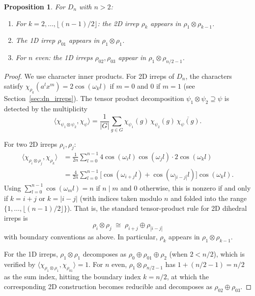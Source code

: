 \documentclass{article}
\newtheorem{proposition}[theorem]{Proposition}
\theoremstyle{definition}
\theoremstyle{remark}
\begin{document}
\begin{proposition}\label{prop:generation}
For $D_n$ with $n > 2$:
\begin{enumerate}
    \item For $k = 2, \ldots, \lfloor(n-1)/2\rfloor$: the 2D irrep $\rho_k$ appears in $\rho_1 \otimes \rho_{k-1}$.
    \item The 1D irrep $\rho_{01}$ appears in $\rho_1 \otimes \rho_1$.
    \item For $n$ even: the 1D irreps $\rho_{02}, \rho_{03}$ appear in $\rho_1 \otimes \rho_{n/2-1}$.
\end{enumerate}
\end{proposition}
\begin{proof}
We use character inner products. For 2D irreps of $D_n$, the characters satisfy $\chi_{\rho_k}(a^l x^m) = 2\cos(\omega_k l)$ if $m = 0$ and $0$ if $m = 1$ (see Section~\ref{sec:dn_irreps}). The tensor product decomposition $\psi_1 \otimes \psi_2 \supseteq \psi$ is detected by the multiplicity
\[
\langle \chi_{\psi_1 \otimes \psi_2}, \chi_\psi \rangle
= \frac{1}{|G|} \sum_{g \in G} \chi_{\psi_1}(g)\, \chi_{\psi_2}(g)\, \overline{\chi_\psi(g)}.
\]

For two 2D irreps $\rho_i, \rho_j$:
\begin{align*}
\langle \chi_{\rho_i \otimes \rho_j}, \chi_{\rho_k} \rangle
&= \frac{1}{2n} \sum_{l=0}^{n-1} 4\cos(\omega_i l)\cos(\omega_j l) \cdot 2\cos(\omega_k l) \\
&= \frac{4}{2n} \sum_{l=0}^{n-1} \bigl[\cos(\omega_{i+j} l) + \cos(\omega_{|i-j|} l)\bigr] \cos(\omega_k l).
\end{align*}
Using $\sum_{l=0}^{n-1} \cos(\omega_m l) = n$ if $n \mid m$ and $0$ otherwise, this is nonzero if and only if $k = i + j$ or $k = |i - j|$ (with indices taken modulo $n$ and folded into the range $\{1, \ldots, \lfloor(n-1)/2\rfloor\}$). That is, the standard tensor-product rule for 2D dihedral irreps is
\[
\rho_i \otimes \rho_j \;\cong\; \rho_{i+j} \oplus \rho_{|i-j|}
\]
with boundary conventions as above. In particular, $\rho_k$ appears in $\rho_1 \otimes \rho_{k-1}$.

For the 1D irreps, $\rho_1 \otimes \rho_1$ decomposes as $\rho_0 \oplus \rho_{01} \oplus \rho_2$ (when $2 < n/2$), which is verified by $\langle \chi_{\rho_1 \otimes \rho_1}, \chi_{\rho_{01}} \rangle = 1$. For $n$ even, $\rho_1 \otimes \rho_{n/2-1}$ has $1 + (n/2 - 1) = n/2$ as the sum index, hitting the boundary index $k = n/2$, at which the corresponding 2D construction becomes reducible and decomposes as $\rho_{02} \oplus \rho_{03}$.
\end{proof}
\end{document}
